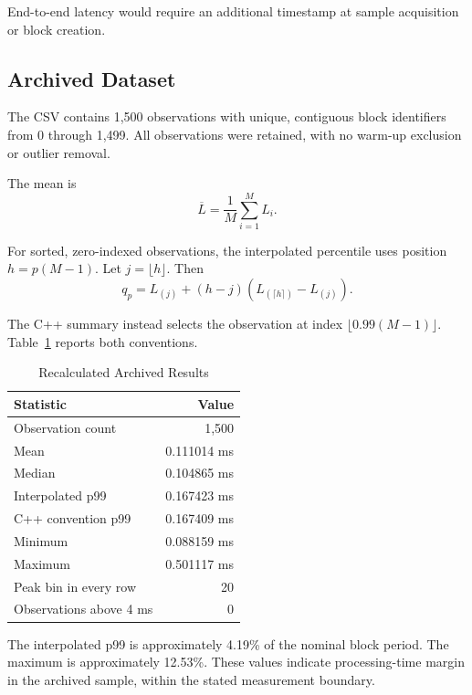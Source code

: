 \documentclass[conference]{IEEEtran}
\begin{document}
End-to-end latency would require an additional timestamp
at sample acquisition or block creation.

\subsection{Archived Dataset}

The CSV contains 1,500 observations with unique, contiguous
block identifiers from 0 through 1,499. All observations
were retained, with no warm-up exclusion or outlier removal.

The mean is
\begin{equation}
\overline{L}=\frac{1}{M}\sum_{i=1}^{M}L_i.
\end{equation}

For sorted, zero-indexed observations, the interpolated
percentile uses position \(h=p(M-1)\). Let
\(j=\lfloor h\rfloor\). Then
\begin{equation}
q_p=L_{(j)}+(h-j)
\left(L_{(\lceil h\rceil)}-L_{(j)}\right).
\end{equation}

The C++ summary instead selects the observation at index
\(\lfloor0.99(M-1)\rfloor\).
Table~\ref{tab:results} reports both conventions.

\begin{table}[t]
\caption{Recalculated Archived Results}
\label{tab:results}
\centering
\begin{tabular}{@{}lr@{}}
\toprule
Statistic & Value \\
\midrule
Observation count & 1,500 \\
Mean & 0.111014 ms \\
Median & 0.104865 ms \\
Interpolated p99 & 0.167423 ms \\
C++ convention p99 & 0.167409 ms \\
Minimum & 0.088159 ms \\
Maximum & 0.501117 ms \\
Peak bin in every row & 20 \\
Observations above 4 ms & 0 \\
\bottomrule
\end{tabular}
\end{table}

The interpolated p99 is approximately 4.19\% of the nominal
block period. The maximum is approximately 12.53\%.
These values indicate processing-time margin in the archived
sample, within the stated measurement boundary.
\end{document}
